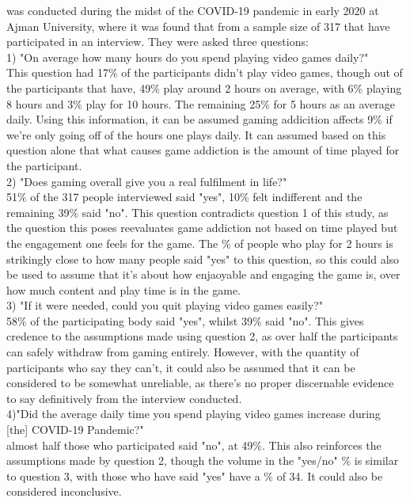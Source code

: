 \documentclass[conference]{IEEEtran}
\begin{document}
\cite{Naaj2021} was conducted during the midst of the COVID-19 pandemic in early 2020 at Ajman University, where it was found that from a sample size of 317 that have participated in an interview. They were asked three questions: \\

1) "On average how many hours do you spend playing video games daily?"\\
This question had 17\%  of the participants didn't play video games, though out of the participants that have, 49\% play around 2 hours on average, with 6\%  playing 8 hours and 3\% play for 10 hours. The remaining 25\%  for 5 hours as an average daily. Using this information, it can be assumed gaming addicition affects 9\% if we're only going off of the hours one plays daily. It can assumed based on this question alone that what causes game addiction is the amount of time played for the participant.\\

2) "Does gaming overall give you a real fulfilment in life?"\\
51\% of the 317 people interviewed said "yes", 10\% felt indifferent and the remaining 39\% said "no".  This question contradicts question 1 of this study, as the question this poses reevaluates game addiction not based on time played but the engagement one feels for the game. The \% of people who play for 2 hours is strikingly close to how many people said "yes" to this question, so this could also be used to assume that it's about how enjaoyable and engaging the game is, over how much content and play time is in the game.\\

3) "If it were needed, could you quit playing video games easily?"\\
58\% of the participating body said "yes", whilst 39\% said "no". This gives credence to the assumptions made using question 2, as over half the participants can safely withdraw from gaming entirely. However, with the quantity of participants who say they can't, it could also be assumed that it can be considered to be somewhat unreliable, as there's no proper discernable evidence to say definitively from the interview conducted.\\ 
 
4)"Did the average daily time you spend playing video games increase during [the] COVID-19 Pandemic?"\\
almost half those who participated said "no", at 49\%. This also reinforces the assumptions made by question 2, though the volume in the "yes/no" \% is similar to question 3, with those who have said "yes" have a \% of 34. It could also be considered inconclusive.
\end{document}
